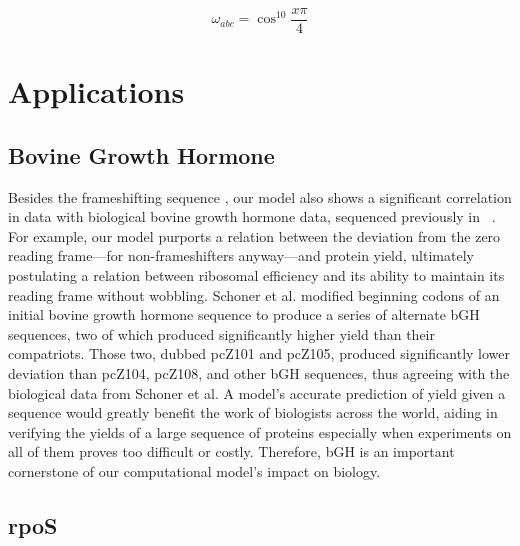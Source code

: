 \documentclass[12pt]{article}
\begin{document}
$$\omega_{abc} = \cos^{10}{\frac{x\pi}{4}}$$

\section{Applications}

\subsection{Bovine Growth Hormone}
Besides the frameshifting sequence \prfB, our model also shows a significant correlation in data with biological
bovine growth hormone data, sequenced previously in \ecoli~\cite{schoner:bgh}. For example, our model purports a relation
between the deviation from the zero reading frame---for non-frameshifters anyway---and protein yield, ultimately postulating
a relation between ribosomal efficiency and its ability to maintain its reading frame without wobbling. Schoner et al.
modified beginning codons of an initial bovine growth hormone sequence to produce a series of alternate bGH sequences,
two of which produced significantly higher yield than their compatriots. Those two, dubbed pcZ101 and pcZ105, produced significantly
lower deviation than pcZ104, pcZ108, and other bGH sequences, thus agreeing with the biological data from Schoner et al.
A model's accurate prediction of yield given a sequence would greatly benefit the work of biologists across the world,
aiding in verifying the yields of a large sequence of proteins especially when experiments on all of them proves too difficult
or costly. Therefore, bGH is an important cornerstone of our computational model's impact on biology.

\subsection{rpoS}


\end{document}
